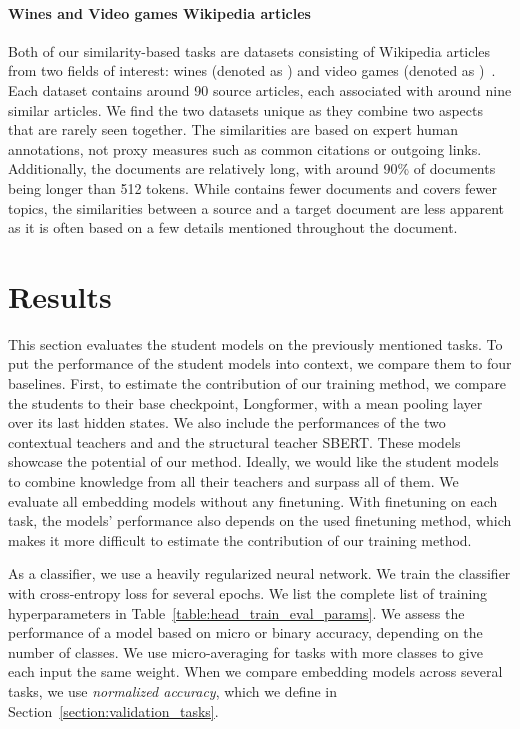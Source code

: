 \paragraph{Wines and Video games Wikipedia articles} Both of our
similarity-based tasks are datasets consisting of Wikipedia articles from two
fields of interest: wines (denoted as ) and video games (denoted
as )~\citep{ginzburg2021self}. Each dataset contains around 90
source articles, each associated with around nine similar articles. We find the two
datasets unique as they combine two aspects that are rarely seen together. The
similarities are based on expert human annotations, not proxy measures
such as common citations or outgoing links. Additionally, the documents are
relatively long, with around 90\% of documents being longer than 512 tokens.
While  contains fewer documents and covers fewer topics, the
similarities between a source and a target document are less apparent as it is
often based on a few details mentioned throughout the document.

\section{Results}\label{section:eval_results}

This section evaluates the student models on the previously mentioned
tasks. To put the performance of the student models into context, we compare
them to four baselines. First, to estimate the contribution of our training
method, we compare the students to their base checkpoint, Longformer, with a mean pooling layer over its last hidden states. We also include the
performances of the two contextual teachers  and  and the
structural teacher SBERT. These models showcase the potential of our method.
Ideally, we would like the student models to combine knowledge from all their
teachers and surpass all of them. We evaluate all embedding models without any
finetuning. With finetuning on each task, the models' performance also depends
on the used finetuning method, which makes it more difficult to estimate the
contribution of our training method.

As a classifier, we use a heavily regularized neural network. We
train the classifier with cross-entropy loss for several epochs. We list the
complete list of training hyperparameters in
Table~\ref{table:head_train_eval_params}. We assess the performance of a model
based on micro or binary accuracy, depending on the number of classes. We use micro-averaging for
tasks with more classes to give each input the same
weight. When we compare embedding models across several tasks, we use
\emph{normalized accuracy}, which we define in
Section~\ref{section:validation_tasks}.

